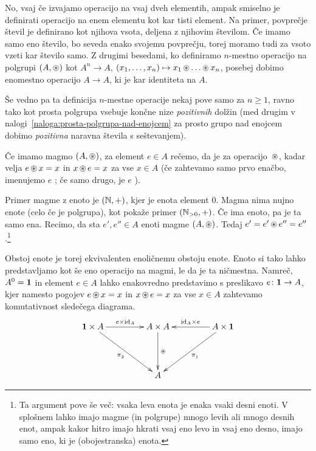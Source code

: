 No, vsaj če izvajamo operacijo na vsaj dveh elementih, ampak smiselno je definirati operacijo na enem elementu kot kar tisti element. Na primer, povprečje števil je definirano kot njihova vsota, deljena z njihovim številom. Če imamo samo eno število, bo seveda enako svojemu povprečju, torej moramo tudi za vsoto vzeti kar število samo. Z drugimi besedami, ko definiramo $n$-mestno operacijo na polgrupi $(A, \mathop{\circledast}\nolimits)$ kot $A^n \to A$, $(x_1, \ldots, x_n) \mapsto x_1 \mathop{\circledast}\nolimits \ldots \mathop{\circledast}\nolimits x_n$, posebej dobimo enomestno operacijo $A \to A$, ki je kar identiteta na $A$.

Še vedno pa ta definicija $n$-mestne operacije nekaj pove samo za $n \geq 1$, ravno tako kot prosta polgrupa vsebuje končne nize \emph{pozitivnih} dolžin (med drugim v nalogi~\ref{naloga:prosta-polgrupa-nad-enojcem} za prosto grupo nad enojcem dobimo \emph{pozitivna} naravna števila s seštevanjem). 

Če imamo magmo $(A, \mathop{\circledast}\nolimits)$, za element $e \in A$ rečemo, da je  za operacijo~$\mathop{\circledast}\nolimits$, kadar velja $e \mathop{\circledast}\nolimits x = x$ in $x \mathop{\circledast}\nolimits e = x$ za vse $x \in A$ (če zahtevamo samo prvo enačbo, imenujemo $e$ ; če samo drugo, je $e$ ).

Primer magme z enoto je $(\mathbb{N}, +)$, kjer je enota element $0$. Magma nima nujno enote (celo če je polgrupa), kot pokaže primer $(\mathbb{N}_{> 0}, +)$. Če ima enoto, pa je ta samo ena. Recimo, da sta $e', e'' \in A$ enoti magme $(A, \mathop{\circledast}\nolimits)$. Tedaj $e' = e' \mathop{\circledast}\nolimits e'' = e''$.\footnote{Ta argument pove še več: vsaka leva enota je enaka vsaki desni enoti. V splošnem lahko imajo magme (in polgrupe) mnogo levih ali mnogo desnih enot, ampak kakor hitro imajo hkrati vsaj eno levo in vsaj eno desno, imajo samo eno, ki je (obojestranska) enota.}

Obstoj enote je torej ekvivalenten enoličnemu obstoju enote. Enoto si tako lahko predstavljamo kot še eno operacijo na magmi, le da je ta ničmestna. Namreč, $A^0 = \mathtt{\mathbf{1}}$ in element $e \in A$ lahko enakovredno predstavimo s preslikavo $e\colon \mathtt{\mathbf{1}} \to A$, kjer namesto pogojev $e \mathop{\circledast}\nolimits x = x$ in $x \mathop{\circledast}\nolimits e = x$ za vse $x \in A$ zahtevamo komutativnost sledečega diagrama.
\[\xymatrix@+2em{
\one \times A \ar[r]^{e \times \id[A]} \ar[rd]_{\snd} & A \times A \ar[d]^{\oper} & A \times \one \ar[l]_{\id[A] \times e} \ar[ld]^{\fst} \\
& A &
}\]

